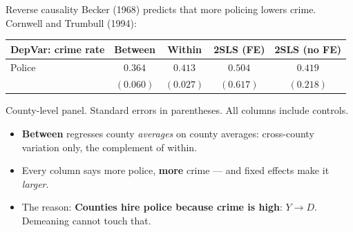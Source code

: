 \documentclass[
  11pt,
  ignorenonframetext,
  aspectratio=169,
]{beamer}
\providecommand{\tightlist}{%
  \setlength{\itemsep}{0pt}\setlength{\parskip}{0pt}}
\begin{document}
\begin{frame}{Reverse causality}
\protect{}\label{reverse-causality}
Becker (1968) predicts that more policing lowers crime. Cornwell and
Trumbull (1994):

\begin{center}\small
\begin{tabular}{lcccc}
\toprule
DepVar: crime rate & Between & Within & 2SLS (FE) & 2SLS (no FE) \\
\midrule
Police & $0.364$ & $0.413$ & $0.504$ & $0.419$ \\
       & $(0.060)$ & $(0.027)$ & $(0.617)$ & $(0.218)$ \\
\bottomrule
\end{tabular}
\end{center}

\vspace{-0.2em}
\footnotesize

County-level panel. Standard errors in parentheses. All columns include
controls. \normalsize

\begin{itemize}
\tightlist
\item
  \textbf{Between} regresses county \emph{averages} on county averages:
  cross-county variation only, the complement of within.
\item
  Every column says more police, \textbf{more} crime --- and fixed
  effects make it \emph{larger}.
\item
  The reason: \textbf{Counties hire police because crime is high}:
  \(Y \to D\). Demeaning cannot touch that.
\end{itemize}
\end{frame}
\end{document}

